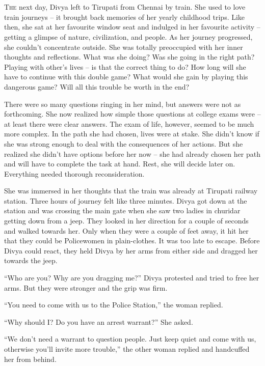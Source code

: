 \chapter{}

\lettrine{T}{he} next day, Divya left to Tirupati from Chennai by train. She used to love
train journeys – it brought back memories of her yearly childhood trips. Like
then, she sat at her favourite window seat and indulged in her favourite activity
– getting a glimpse of nature, civilization, and people. As her journey
progressed, she couldn't concentrate outside. She was totally preoccupied with
her inner thoughts and reflections. What was she doing? Was she going in the
right path? Playing with other's lives – is that the correct thing to do? How
long will she have to continue with this double game? What would she gain by
playing this dangerous game? Will all this trouble be worth in the end?

There were so many questions ringing in her mind, but answers were not as
forthcoming. She now realized how simple those questions at college exams were –
at least there were clear answers. The exam of life, however, seemed to be much
more complex. In the path she had chosen, lives were at stake. She didn't know
if she was strong enough to deal with the consequences of her actions. But she
realized she didn't have options before her now – she had already chosen her
path and will have to complete the task at hand. Rest, she will decide later on.
Everything needed thorough reconsideration.

She was immersed in her thoughts that the train was already at Tirupati railway
station. Three hours of journey felt like three minutes. Divya got down at the
station and was crossing the main gate when she saw two ladies in churidar
getting down from a jeep. They looked in her direction for a couple of seconds
and walked towards her. Only when they were a couple of feet away, it hit her
that they could be Policewomen in plain-clothes. It was too late to escape.
Before Divya could react, they held Divya by her arms from either side and
dragged her towards the jeep.

“Who are you? Why are you dragging me?” Divya protested and tried to free her
arms. But they were stronger and the grip was firm.

“You need to come with us to the Police Station,” the woman replied.

“Why should I? Do you have an arrest warrant?” She asked.

“We don't need a warrant to question people. Just keep quiet and come with us,
otherwise you'll invite more trouble,” the other woman replied and handcuffed
her from behind.

